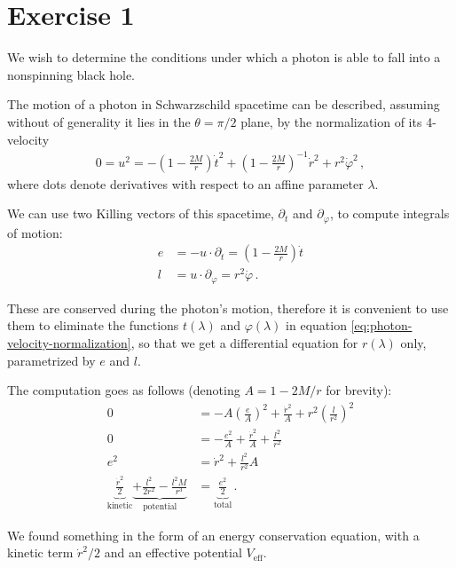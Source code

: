 \documentclass[main.tex]{subfiles}
\begin{document}
\section*{Exercise 1}

We wish to determine the conditions under which a photon is able to fall into a nonspinning black hole.

The motion of a photon in Schwarzschild spacetime can be described, 
assuming without of generality it lies in the \(\theta = \pi / 2\) plane, 
by the normalization of its 4-velocity %
\begin{align} \label{eq:photon-velocity-normalization}
0 = u^2 = - \left(1 - \frac{2M}{r}\right) \dot{t}^2 + \left(1 - \frac{2M}{r}\right)^{-1} \dot{r}^2 + r^2 \dot{\varphi}^2
\,,
\end{align}
%
where dots denote derivatives with respect to an affine parameter \(\lambda\). 

We can use two Killing vectors of this spacetime, \(\partial_t\) and \(\partial_\varphi\), 
to compute integrals of motion: %
\begin{align}
e &= - u \cdot \partial_t = \left(1 - \frac{2M}{r}\right) \dot{t}  \\
l &= u \cdot \partial_\varphi = r^2 \dot{\varphi}
\,.
\end{align}

These are conserved during the photon's motion, therefore it is convenient to use them to 
eliminate the functions \(t(\lambda )\) and \(\varphi (\lambda )\) in equation \eqref{eq:photon-velocity-normalization}, 
so that we get a differential equation for \(r(\lambda )\) only, parametrized by \(e\) and \(l\).

The computation goes as follows (denoting \(A =1 - 2M/r\) for brevity): 
%
\begin{align}
0 &= - A \left( \frac{e}{A}\right)^2 + \frac{\dot{r}^2}{A} + r^2 \left( \frac{l}{r^2}\right)^2   \\
0 &= - \frac{e^2}{A} + \frac{\dot{r}^2}{A} + \frac{l^2}{r^2}  \\
e^2 &= \dot{r}^2 + \frac{l^2}{r^2} A \\
\underbrace{\frac{\dot{r}^2}{2}}_{\text{kinetic}} 
\underbrace{+ \frac{l^2}{2r^2} - \frac{l^2M}{r^3}}_{\text{potential}} &= \underbrace{\frac{e^2}{2}}_{\text{total}} \label{eq:photon-trajectory-schwarzschild}
\,.
\end{align}

We found something in the form of an energy conservation equation, 
with a kinetic term \(\dot{r}^2 / 2\) and an effective potential \(V _{\text{eff}}\). 
\end{document}
